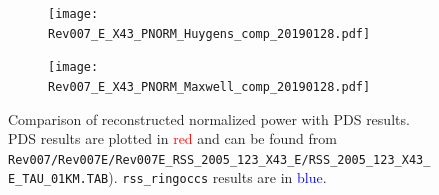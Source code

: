 \documentclass[titlepage, 12pt]{article}
\begin{document}
            \begin{figure}[H]
                \centering
                \begin{subfigure}[b]{0.49\textwidth}
                    \texttt{[image: Rev007\_E\_X43\_PNORM\_Huygens\_comp\_20190128.pdf]}
                \end{subfigure}
                \begin{subfigure}[b]{0.49\textwidth}
                    \texttt{[image: Rev007\_E\_X43\_PNORM\_Maxwell\_comp\_20190128.pdf]}
                \end{subfigure}
                \caption[Comparison of Reconstructed Power]
                        {Comparison of reconstructed normalized power
                         with PDS results. PDS results are plotted in
                         \textcolor{red}{red} and can be found from
                         \texttt{Rev007/Rev007E/Rev007E\_RSS\_2005\_123\_X43\_E/RSS\_2005\_123\_X43\_E\_TAU\_01KM.TAB}).
                         \texttt{rss\_ringoccs} results are in
                         \textcolor{blue}{blue}.}
                \hfill
                \label{fig:rev7ex43_huygens_comp}
            \end{figure}
\end{document}
